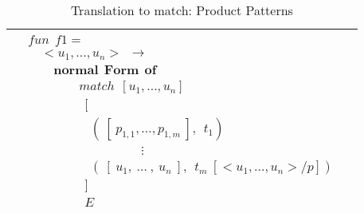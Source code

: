 \documentclass[11pt]{article}
\begin{document}
\begin{table}[!h]
\begin{center}
\begin{tabular}{|c|c|}
\begin{minipage}{3.6in}
{
\begin{align*} 
&fun~~f1 = \\
&\quad <u_1,\ldots,u_n> ~~ \to \\
&\quad \quad \mathbf {normal~~Form~~of} \\
&\qquad \qquad match~~[u_1,\ldots,u_n] \\
&\qquad \qquad~~ [\\
&\qquad \qquad~~~~(~[~p_{1,1},\ldots,p_{1,m}~],~~t_1) \\
&\qquad \qquad~~~~ \qquad\qquad \vdots\qquad\qquad  \\ 
&\qquad \qquad~~~~(~[~u_{1},~\ldots~, ~u_{n}~],~~t_m~[<u_1,\ldots,u_n>/p]) \\
&\qquad \qquad~~ ]\\
&\qquad \qquad~~ E
\end{align*}
}
\end {minipage}
\tabularnewline
\hline
\end{tabular}
\caption{Translation to match: Product Patterns}
\label{Pmatch:ProdTrans}
\end{center}
\end{table}
\end{document}
